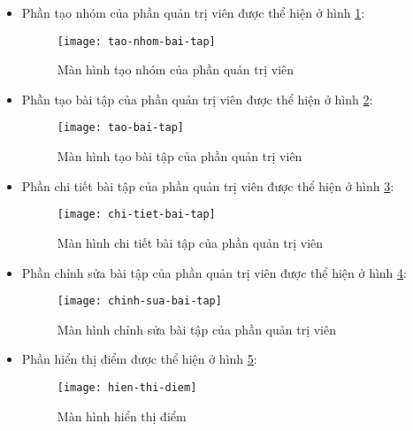 \documentclass[../Thesis.tex]{subfiles}
\begin{document}
\begin{itemize}
                \item Phần tạo nhóm của phần quản trị viên được thể hiện ở hình \ref{fig:tao-nhom-bai-tap}:
                \begin{figure}[hbt!]
                    \centering\texttt{[image: tao-nhom-bai-tap]}
                    \caption{Màn hình tạo nhóm của phần quản trị viên}
                    \label{fig:tao-nhom-bai-tap}
                \end{figure}
                \FloatBarrier

                \item Phần tạo bài tập của phần quản trị viên được thể hiện ở hình \ref{fig:tao-bai-tap}:
                \begin{figure}[hbt!]
                    \centering\texttt{[image: tao-bai-tap]}
                    \caption{Màn hình tạo bài tập của phần quản trị viên}
                    \label{fig:tao-bai-tap}
                \end{figure}
                \FloatBarrier

                \item Phần chi tiết bài tập của phần quản trị viên được thể hiện ở hình \ref{fig:chi-tiet-bai-tap}:
                \begin{figure}[hbt!]
                    \centering\texttt{[image: chi-tiet-bai-tap]}
                    \caption{Màn hình chi tiết bài tập của phần quản trị viên}
                    \label{fig:chi-tiet-bai-tap}
                \end{figure}
                \FloatBarrier

                \item Phần chỉnh sửa bài tập của phần quản trị viên được thể hiện ở hình \ref{fig:chinh-sua-bai-tap}:
                \begin{figure}[hbt!]
                    \centering\texttt{[image: chinh-sua-bai-tap]}
                    \caption{Màn hình chỉnh sửa bài tập của phần quản trị viên}
                    \label{fig:chinh-sua-bai-tap}
                \end{figure}
                \FloatBarrier

                \item Phần hiển thị điểm được thể hiện ở hình \ref{fig:hien-thi-diem}:
                \begin{figure}[hbt!]
                    \centering\texttt{[image: hien-thi-diem]}
                    \caption{Màn hình hiển thị điểm}
                    \label{fig:hien-thi-diem}
                \end{figure}
                \FloatBarrier


\end{itemize}
\end{document}
